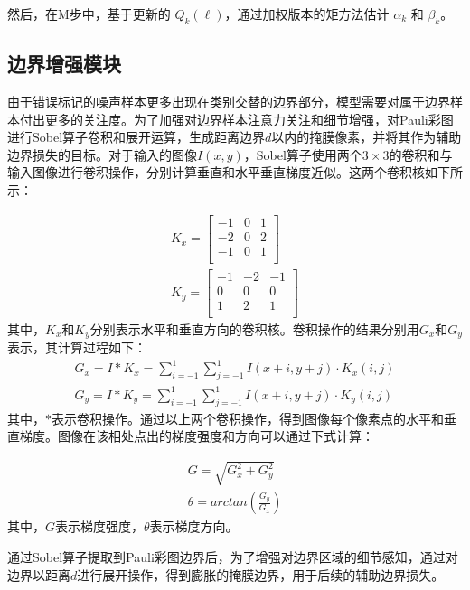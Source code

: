 然后，在M步中，基于更新的 \(Q_k(\ell)\)，通过加权版本的矩方法估计 \(\alpha_k\) 和 \(\beta_k\)。

\subsection{边界增强模块}

由于错误标记的噪声样本更多出现在类别交替的边界部分，模型需要对属于边界样本付出更多的关注度。为了加强对边界样本注意力关注和细节增强，对Pauli彩图进行Sobel算子卷积和展开运算，生成距离边界$d$以内的掩膜像素，并将其作为辅助边界损失的目标。对于输入的图像$I(x,y)$，Sobel算子使用两个$3 \times 3$的卷积和与输入图像进行卷积操作，分别计算垂直和水平垂直梯度近似。这两个卷积核如下所示：

\begin{gather}
  K_x=\left[ \begin{matrix}
      -1 & 0 & 1 \\
      -2 & 0 & 2 \\
      -1 & 0 & 1 \\
    \end{matrix} \right]
  \\
  K_y=\left[ \begin{matrix}
      -1 & -2 & -1 \\
      0  & 0  & 0  \\
      1  & 2  & 1  \\
    \end{matrix} \right]
\end{gather}
其中，$K_x$和$K_y$分别表示水平和垂直方向的卷积核。卷积操作的结果分别用$G_x$和$G_y$表示，其计算过程如下：
\begin{gather}
  G_x=I \ast K_x=\sum_{i=-1}^1{\sum_{j=-1}^1{I\left( x+i,y+j \right) \cdot K_x\left( i,j \right)}}
  \\
  G_y=I \ast K_y=\sum_{i=-1}^1{\sum_{j=-1}^1{I\left( x+i,y+j \right) \cdot K_y\left( i,j \right)}}
\end{gather}
其中，$\ast$表示卷积操作。通过以上两个卷积操作，得到图像每个像素点的水平和垂直梯度。图像在该相处点出的梯度强度和方向可以通过下式计算：

\begin{gather}
  G=\sqrt{G_x^2+G_y^2}
  \\
  \theta=arctan(\frac{G_y}{G_x})
\end{gather}
其中，$G$表示梯度强度，$\theta$表示梯度方向。

通过Sobel算子提取到Pauli彩图边界后，为了增强对边界区域的细节感知，通过对边界以距离$d$进行展开操作，得到膨胀的掩膜边界，用于后续的辅助边界损失。

